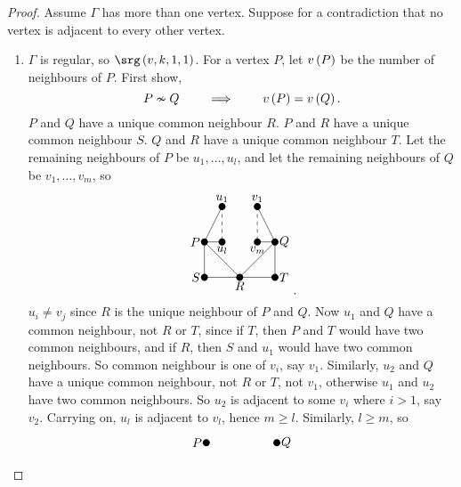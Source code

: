 \begin{proof}
Assume $ \Gamma $ has more than one vertex. Suppose for a contradiction that no vertex is adjacent to every other vertex.
\begin{enumerate}[leftmargin=0.5in, label=Step \arabic*.]
\item $ \Gamma $ is regular, so $ \srg\br{v, k, 1, 1} $. For a vertex $ P $, let $ v\br{P} $ be the number of neighbours of $ P $. First show,
\begin{equation}
\label{eq:3}
P \nsim Q \qquad \implies \qquad v\br{P} = v\br{Q}.
\end{equation}
$ P $ and $ Q $ have a unique common neighbour $ R $. $ P $ and $ R $ have a unique common neighbour $ S $. $ Q $ and $ R $ have a unique common neighbour $ T $. Let the remaining neighbours of $ P $ be $ u_1, \dots, u_l $, and let the remaining neighbours of $ Q $ be $ v_1, \dots, v_m $, so
$$
\begin{tikzpicture}
\fill (0, 0) circle (0.1) node[left]{$ P $};
\fill (2, 0) circle (0.1) node[right]{$ Q $};
\fill (0, -1) circle (0.1) node[left]{$ S $};
\fill (1, -1) circle (0.1) node[below]{$ R $};
\fill (2, -1) circle (0.1) node[right]{$ T $};
\fill (0.5, 1) circle (0.1) node[above]{$ u_1 $};
\fill (0.5, 0) circle (0.1) node[below]{$ u_l $};
\fill (1.5, 1) circle (0.1) node[above]{$ v_1 $};
\fill (1.5, 0) circle (0.1) node[below]{$ v_m $};
\draw (0, 0) to (1, -1);
\draw (2, 0) to (1, -1);
\draw (0, 0) to (0, -1);
\draw (1, -1) to (0, -1);
\draw (2, 0) to (2, -1);
\draw (1, -1) to (2, -1);
\draw (0, 0) to (0.5, 1);
\draw (0, 0) to (0.5, 0);
\draw [dashed] (0.5, 1) to (0.5, 0);
\draw (2, 0) to (1.5, 1);
\draw (2, 0) to (1.5, 0);
\draw [dashed] (1.5, 1) to (1.5, 0);
\end{tikzpicture}.
$$
$ u_i \ne v_j $ since $ R $ is the unique neighbour of $ P $ and $ Q $. Now $ u_1 $ and $ Q $ have a common neighbour, not $ R $ or $ T $, since if $ T $, then $ P $ and $ T $ would have two common neighbours, and if $ R $, then $ S $ and $ u_1 $ would have two common neighbours. So common neighbour is one of $ v_i $, say $ v_1 $. Similarly, $ u_2 $ and $ Q $ have a unique common neighbour, not $ R $ or $ T $, not $ v_1 $, otherwise $ u_1 $ and $ u_2 $ have two common neighbours. So $ u_2 $ is adjacent to some $ v_i $ where $ i > 1 $, say $ v_2 $. Carrying on, $ u_l $ is adjacent to $ v_l $, hence $ m \ge l $. Similarly, $ l \ge m $, so
$$
\begin{tikzpicture}
\fill (0, 0) circle (0.1) node[left]{$ P $};
\fill (2, 0) circle (0.1) node[right]{$ Q $};

\end{tikzpicture}$$
\end{enumerate}
\end{proof}
